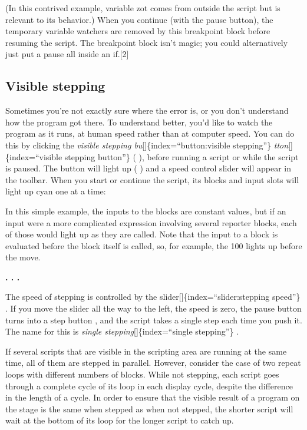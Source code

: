 \documentclass[
  letterpaper,
]{book}
\begin{document}
(In this contrived example, variable zot comes from outside the script
but is relevant to its behavior.) When you continue (with the pause
button), the temporary variable watchers are removed by this breakpoint
block before resuming the script. The breakpoint block isn't magic; you
could alternatively just put a pause all inside an if.{[}2{]}

\subsection{Visible stepping}\label{visible-stepping}

Sometimes you're not exactly sure where the error is, or you don't
understand how the program got there. To understand better, you'd like
to watch the program as it runs, at human speed rather than at computer
speed. You can do this by clicking the \emph{visible stepping
bu}{[}{]}\{index=``button:visible stepping''\}
\emph{tton}{[}{]}\{index=``visible stepping button''\} ( ), before
running a script or while the script is paused. The button will light up
( ) and a speed control slider will appear in the toolbar. When you
start or continue the script, its blocks and input slots will light up
cyan one at a time:

In this simple example, the inputs to the blocks are constant values,
but if an input were a more complicated expression involving several
reporter blocks, each of those would light up as they are called. Note
that the input to a block is evaluated before the block itself is
called, so, for example, the 100 lights up before the move.

\textbf{. . .}

The speed of stepping is controlled by the
slider{[}{]}\{index=``slider:stepping speed''\} . If you move the slider
all the way to the left, the speed is zero, the pause button turns into
a step button , and the script takes a single step each time you push
it. The name for this is \emph{single stepping}{[}{]}\{index=``single
stepping''\} \emph{.}

If several scripts that are visible in the scripting area are running at
the same time, all of them are stepped in parallel. However, consider
the case of two repeat loops with different numbers of blocks. While not
stepping, each script goes through a complete cycle of its loop in each
display cycle, despite the difference in the length of a cycle. In order
to ensure that the visible result of a program on the stage is the same
when stepped as when not stepped, the shorter script will wait at the
bottom of its loop for the longer script to catch up.
\end{document}
